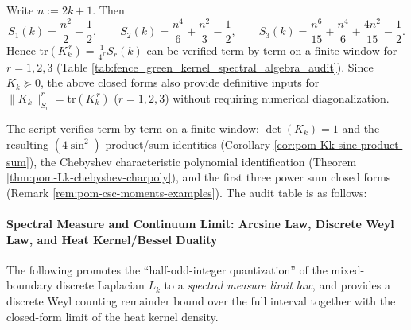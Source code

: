 \begin{remark}\label{rem:pom-csc-moments-examples}
Write \(n:=2k+1\). Then
\[
S_1(k)=\frac{n^2}{2}-\frac12,\qquad
S_2(k)=\frac{n^4}{6}+\frac{n^2}{3}-\frac12,\qquad
S_3(k)=\frac{n^6}{15}+\frac{n^4}{6}+\frac{4n^2}{15}-\frac12.
\]
Hence \(\mathrm{tr}(K_k^{\,r})=\frac{1}{4^{\,r}}S_r(k)\) can be verified term by term on a finite window for \(r=1,2,3\) (Table \ref{tab:fence_green_kernel_spectral_algebra_audit}).
Since \(K_k\succeq 0\), the above closed forms also provide definitive inputs for \(\|K_k\|_{S_r}^r=\mathrm{tr}(K_k^{\,r})\) (\(r=1,2,3\)) without requiring numerical diagonalization.
\end{remark}

\begin{remark}\label{rem:pom-fence-green-kernel-spectral-algebra-audit}
The script verifies term by term on a finite window: \(\det(K_k)=1\) and the resulting \((4\sin^2)\) product/sum identities (Corollary \ref{cor:pom-Kk-sine-product-sum}),
the Chebyshev characteristic polynomial identification (Theorem \ref{thm:pom-Lk-chebyshev-charpoly}),
and the first three power sum closed forms (Remark \ref{rem:pom-csc-moments-examples}).
The audit table is as follows:

\end{remark}

\paragraph{Spectral Measure and Continuum Limit: Arcsine Law, Discrete Weyl Law, and Heat Kernel/Bessel Duality}
The following promotes the ``half-odd-integer quantization'' of the mixed-boundary discrete Laplacian \(L_k\) to a \emph{spectral measure limit law},
and provides a discrete Weyl counting remainder bound over the full interval together with the closed-form limit of the heat kernel density.

